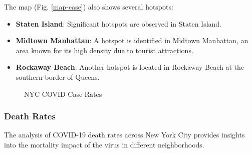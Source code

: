 \documentclass[10pt,journal,compsoc]{IEEEtran}
\begin{document}
The map (Fig. \ref{map-case}) also shows several hotspots:
\begin{itemize}
    \item \textbf{Staten Island}: Significant hotspots are observed in Staten Island.
    \item \textbf{Midtown Manhattan}: A hotspot is identified in Midtown Manhattan, an area known for its high density due to tourist attractions.
    \item \textbf{Rockaway Beach}: Another hotspot is located in Rockaway Beach at the southern border of Queens.
\end{itemize}

\begin{figure}[t]
    \centering
    \caption{NYC COVID Case Rates}
\end{figure}

\subsubsection{Death Rates}

The analysis of COVID-19 death rates across New York City provides insights into the mortality impact of the virus in different neighborhoods.
\end{document}
